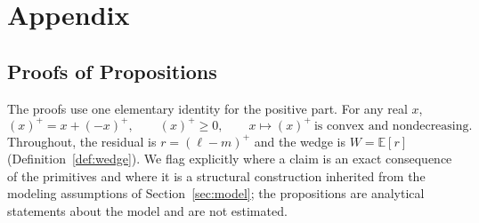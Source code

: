 \documentclass[a4paper,fleqn,longmktitle]{cas-sc}
\newcommand{\nb}[1]{\textcolor{blue}{NB[#1]}}
\theoremstyle{plain}
\theoremstyle{definition}
\newcommand{\E}{\mathbb{E}}
\newcommand{\pos}[1]{\left(#1\right)^{+}}
\begin{document}



\newpage

\appendix
\section{Appendix}

\subsection{Proofs of Propositions}\label{app:proofs}

The proofs use one elementary identity for the positive part. For any real $x$,
\begin{equation}
    \pos{x}=x+\pos{-x},\qquad \pos{x}\ge 0,\qquad x\mapsto\pos{x}\ \text{is convex and nondecreasing.}
    \label{eq:posident}
\end{equation}
Throughout, the residual is $r=\pos{\ell-m}$ and the wedge is $W=\E[r]$ (Definition~\ref{def:wedge}). We flag explicitly where a claim is an exact consequence of the primitives and where it is a structural construction inherited from the modeling assumptions of Section~\ref{sec:model}; the propositions are analytical statements about the model and are not estimated.
\end{document}
